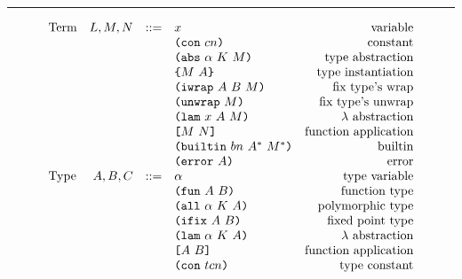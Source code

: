 \documentclass[../plutus-core-specification.tex]{subfiles}
\begin{document}
\medskip\hrule\medskip

\begin{minipage}{\linewidth}
    \centering
    \[\begin{array}{lrclr}
        \textrm{Term}             & L,M,N  & ::= & x                          & \textrm{variable}\\
                                  &        &     & \texttt{(} \texttt{con} ~ cn \texttt{)}                   & \textrm{constant}\\
                                  &        &     & \texttt{(} \texttt{abs} ~ \alpha ~ K ~ M \texttt{)}         & \textrm{type abstraction}\\
                                  &        &     & \texttt{\{}M ~ A\texttt{\}}                & \textrm{type instantiation}\\
                                  &        &     & \texttt{(} \texttt{iwrap} ~ A ~ B ~ M \texttt{)}            & \textrm{fix type's wrap}\\
                                  &        &     & \texttt{(} \texttt{unwrap} ~ M \texttt{)}                 & \textrm{fix type's unwrap}\\
                                  &        &     & \texttt{(} \texttt{lam} ~ x ~ A ~ M \texttt{)}              & \textrm{$\lambda$ abstraction}\\
                                  &        &     & \texttt{[} M ~ N \texttt{]}                 & \textrm{function application}\\
                                  &        &     & \texttt{(} \texttt{builtin} ~ bn ~ A^* ~ M^* \texttt{)}     & \textrm{builtin}\\
                                  &        &     & \texttt{(} \texttt{error} ~ A \texttt{)}                  & \textrm{error}\\
        \textrm{Type}             & A,B,C  & ::= & \alpha                     & \textrm{type variable}\\
                                  &        &     & \texttt{(} \texttt{fun} ~ A ~ B \texttt{)}                & \textrm{function type}\\
                                  &        &     & \texttt{(} \texttt{all} ~ \alpha ~ K ~ A \texttt{)}        & \textrm{polymorphic type}\\
                                  &        &     & \texttt{(} \texttt{ifix} ~ A ~ B \texttt{)}                & \textrm{fixed point type}\\
                                  &        &     & \texttt{(} \texttt{lam} ~ \alpha ~ K ~ A \texttt{)}        & \textrm{$\lambda$ abstraction}\\
                                  &        &     & \texttt{[} A ~ B \texttt{]}                & \textrm{function application}\\
                                  &        &     & \texttt{(} \texttt{con} ~ tcn \texttt{)}                 & \textrm{type constant}\\

\end{array}\]
\end{minipage}
\end{document}
